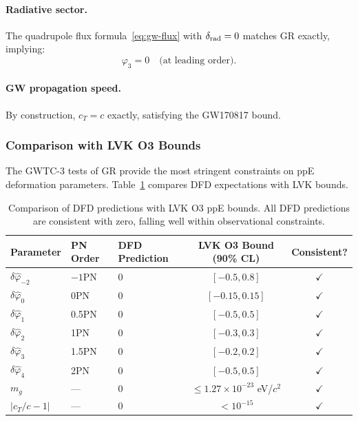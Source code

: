 \paragraph{Radiative sector.}
The quadrupole flux formula~\eqref{eq:gw-flux} with $\delta_{\rm rad} = 0$ matches GR exactly, implying:
\begin{equation}
\varphi_3 = 0 \quad \text{(at leading order)}.
\end{equation}

\paragraph{GW propagation speed.}
By construction, $c_T = c$ exactly, satisfying the GW170817 bound.

\subsubsection{Comparison with LVK O3 Bounds}\label{sec:gw-o3}

The GWTC-3 tests of GR \cite{LIGO2021TGR} provide the most stringent constraints on ppE deformation parameters. Table~\ref{tab:ppe-bounds} compares DFD expectations with LVK bounds.

\begin{table}[t]
\centering
\footnotesize
\caption{Comparison of DFD predictions with LVK O3 ppE bounds. All DFD predictions are consistent with zero, falling well within observational constraints.}\label{tab:ppe-bounds}
\renewcommand{\arraystretch}{1.2}
\begin{tabular}{lllcc}
\toprule
Parameter & PN Order & DFD Prediction & LVK O3 Bound (90\% CL) & Consistent? \\
\midrule
$\delta\hat{\varphi}_{-2}$ & $-1$PN & 0 & $[-0.5, 0.8]$ & $\checkmark$ \\
$\delta\hat{\varphi}_0$ & 0PN & 0 & $[-0.15, 0.15]$ & $\checkmark$ \\
$\delta\hat{\varphi}_1$ & 0.5PN & 0 & $[-0.5, 0.5]$ & $\checkmark$ \\
$\delta\hat{\varphi}_2$ & 1PN & 0 & $[-0.3, 0.3]$ & $\checkmark$ \\
$\delta\hat{\varphi}_3$ & 1.5PN & 0 & $[-0.2, 0.2]$ & $\checkmark$ \\
$\delta\hat{\varphi}_4$ & 2PN & 0 & $[-0.5, 0.5]$ & $\checkmark$ \\
$m_g$ & --- & 0 & $\leq 1.27 \times 10^{-23}$ eV/$c^2$ & $\checkmark$ \\
$|c_T/c - 1|$ & --- & 0 & $< 10^{-15}$ & $\checkmark$ \\
\bottomrule
\end{tabular}
\end{table}

